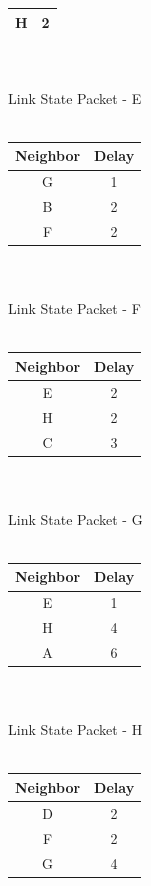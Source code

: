 \documentclass[12pt]{article}
\begin{document}
\begin{enumerate}
\begin{center}
\begin{tabular}{|c|c|}
      \hline
      H & 2 \\
      \hline
    \end{tabular} 
    ~\\ ~\\ Link State Packet - E \\ ~\\
    \begin{tabular}{|c|c|}
      \hline
      Neighbor & Delay \\
      \hline
      G & 1 \\
      \hline
      B & 2 \\
      \hline
      F & 2 \\
      \hline
    \end{tabular} 
    ~\\ ~\\ Link State Packet - F \\ ~\\
    \begin{tabular}{|c|c|}
      \hline
      Neighbor & Delay \\
      \hline
      E & 2 \\
      \hline
      H & 2 \\
      \hline
      C & 3 \\
      \hline
    \end{tabular} 
    ~\\ ~\\ Link State Packet - G \\ ~\\
    \begin{tabular}{|c|c|}
      \hline
      Neighbor & Delay \\
      \hline
      E & 1 \\
      \hline
      H & 4 \\
      \hline
      A & 6 \\
      \hline
    \end{tabular} 
    ~\\ ~\\ Link State Packet - H \\ ~\\
    \begin{tabular}{|c|c|}
      \hline
      Neighbor & Delay \\
      \hline
      D & 2 \\
      \hline
      F & 2 \\
      \hline
      G & 4 \\
      \hline
    \end{tabular} 
  \end{center}
      
\end{enumerate}
\end{document}
